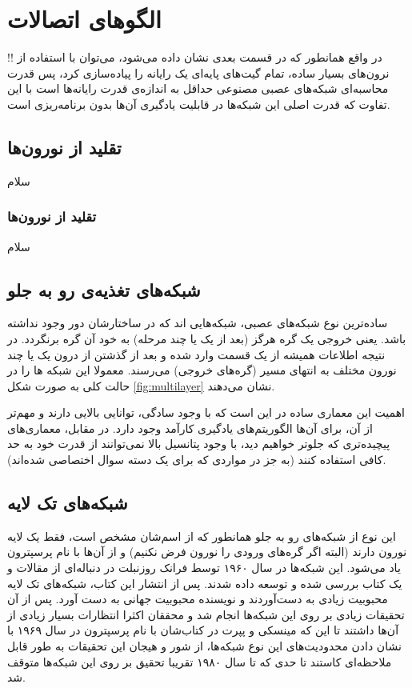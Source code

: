 \documentclass[11pt,a4paper,twocolumn]{article}
\begin{document}
\section{الگو‌های اتصالات}
!!
در واقع همانطور که در قسمت بعدی نشان داده می‌شود، می‌توان با استفاده از نرون‌های 
بسیار ساده، تمام گیت‌های پایه‌ای یک رایانه را پیاده‌‌سازی کرد، پس قدرت محاسبه‌ای شبکه‌های عصبی مصنوعی حداقل به اندازه‌ی قدرت رایانه‌ها است با این تفاوت که قدرت اصلی این شبکه‌ها در قابلیت یادگیری آن‌ها بدون برنامه‌ریزی است.
\subsection{تقلید از نورون‌ها}
سلام
\subsubsection{تقلید از نورون‌ها}
سلام
\subsection{شبکه‌های تغذیه‌ی رو به جلو}
ساده‌ترین نوع شبکه‌های عصبی،‌ شبکه‌هایی اند که در ساختارشان دور وجود نداشته باشد. یعنی خروجی یک گره هرگز (بعد از یک یا چند مرحله) به خود آن گره برنگردد. در نتیجه اطلاعات همیشه از یک قسمت وارد شده و بعد از گذشتن از درون یک یا چند نورون‌ مختلف به انتهای مسیر (گره‌های خروجی)‌ می‌رسند. معمولا این شبکه ها را در حالت کلی به صورت شکل 
\ref{fig:multilayer}
نشان می‌دهند.

اهمیت این معماری ساده در این است که با وجود سادگی،‌ توانایی بالایی دارند و مهم‌تر از آن، برای آن‌ها الگوریتم‌های یادگیری کارآمد وجود دارد. در مقابل، معماری‌های پیچیده‌تری که جلو‌تر خواهیم دید، با وجود پتانسیل بالا نمی‌توانند از قدرت خود به حد کافی استفاده کنند (به جز در مواردی که برای یک دسته سوال اختصاصی شده‌اند).

\subsection{شبکه‌های تک لایه}
این نوع از شبکه‌های رو به جلو همانطور که از اسم‌شان مشخص است، فقط یک لایه نورون دارند (البته اگر گره‌های ورودی را نورون فرض نکنیم) و از آن‌ها با نام 
پرسپترون
یاد می‌شود. این شبکه‌ها در سال ۱۹۶۰ توسط
فرانک روزنبلت
در دنباله‌ای از مقالات و یک 
کتاب
بررسی شده و توسعه داده‌ شدند. پس از انتشار این کتاب، شبکه‌های تک لایه محبوبیت زیادی به دست‌آوردند و نویسنده محبوبیت جهانی به دست آورد. پس از آن تحقیقات زیادی بر روی این شبکه‌ها انجام شد و محققان اکثرا انتظارات بسیار زیادی از آن‌ها داشتند تا این که مینسکی
و پپرت
در کتاب‌شان با نام پرسپترون
در سال ۱۹۶۹ با نشان دادن محدودیت‌های این نوع شبکه‌ها، از شور و هیجان این تحقیقات به طور قابل ملاحظه‌ای کاستند تا حدی که تا سال ۱۹۸۰ تقریبا تحقیق بر روی این شبکه‌ها متوقف شد.\cite{wiki-frank}
\end{document}
